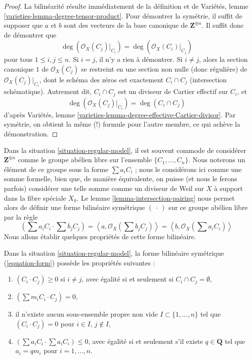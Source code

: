 \begin{proof}
La bilinéarité résulte immédiatement de la définition et de
Variétés, lemme \ref{varieties-lemma-degree-tensor-product}.
Pour démontrer la symétrie, il suffit de supposer que $a$ et $b$ sont des
vecteurs de la base canonique de $\mathbf{Z}^{\oplus n}$.
Il suffit donc de démontrer que
$$
\deg(\mathcal{O}_X(C_j)|_{C_i}) = \deg(\mathcal{O}_X(C_i)|_{C_j})
$$
pour tous $1 \leq i, j \leq n$. Si $i = j$, il n'y a rien à démontrer.
Si $i \not = j$, alors la section canonique $1$ de $\mathcal{O}_X(C_j)$
se restreint en une section non nulle (donc régulière) de $\mathcal{O}_X(C_j)|_{C_i}$,
dont le schéma des zéros est exactement $C_i \cap C_j$ (intersection schématique).
Autrement dit, $C_i \cap C_j$ est un diviseur de Cartier effectif sur $C_i$,
et
$$
\deg(\mathcal{O}_X(C_j)|_{C_i}) = \deg(C_i \cap C_j)
$$
d'après Variétés, lemme \ref{varieties-lemma-degree-effective-Cartier-divisor}.
Par symétrie, on obtient la même (!) formule pour l'autre membre,
ce qui achève la démonstration.
\end{proof}

\noindent
Dans la situation \ref{situation-regular-model}, il est souvent commode de considérer
$\mathbf{Z}^{\oplus n}$ comme le groupe abélien libre sur l'ensemble
$\{C_1, \ldots, C_n\}$. Nous noterons un élément de ce groupe
sous la forme $\sum a_i C_i$ ; nous le considérons ici comme une somme formelle, bien que,
de manière équivalente, on puisse (et nous le ferons parfois)
considérer une telle somme comme un diviseur de Weil sur $X$
à support dans la fibre spéciale $X_k$. Le
lemme \ref{lemma-intersection-pairing}
nous permet alors de définir une forme bilinéaire symétrique $(\ \cdot\ )$
sur ce groupe abélien libre par la règle
\begin{equation}
\label{equation-form}
\left(\sum a_i C_i \cdot \sum b_j C_j\right) =
\left\langle a, \mathcal{O}_X(\sum b_j C_j) \right\rangle =
\left\langle b, \mathcal{O}_X(\sum a_i C_i) \right\rangle
\end{equation}
Nous allons établir quelques propriétés de cette forme bilinéaire.

\begin{lemma}
\label{lemma-properties-form}
Dans la situation \ref{situation-regular-model}, la forme bilinéaire symétrique
(\ref{equation-form}) possède les propriétés suivantes :
\begin{enumerate}
\item $(C_i \cdot C_j) \geq 0$ si $i \not = j$, avec égalité si et seulement
si $C_i \cap C_j = \emptyset$,
\item $(\sum m_i C_i \cdot C_j) = 0$,
\item il n'existe aucun sous-ensemble propre non vide $I \subset \{1, \ldots, n\}$
tel que $(C_i \cdot C_j) = 0$ pour $i \in I$, $j \not \in I$,
\item $(\sum a_i C_i \cdot \sum a_i C_i) \leq 0$, avec égalité si et
seulement s'il existe $q \in \mathbf{Q}$ tel que $a_i = qm_i$
pour $i = 1, \ldots, n$.
\end{enumerate}
\end{lemma}


